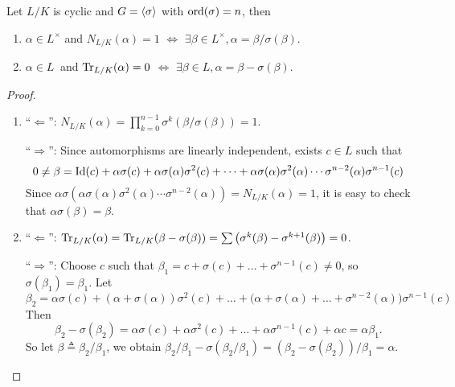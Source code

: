 \begin{theorem} \label{thm:Hilbert-theorem-90}
  Let $L/K$ is cyclic and $G = \langle\sigma\rangle$ with $\operatorname{ord}(\sigma) = n$, then
  \begin{enumerate}
    \item $\alpha \in L^\times$ and $N_{L/K}(\alpha) = 1$ $\iff$ $\exists \beta \in L^\times, \alpha = \beta / \sigma(\beta)$.
    \item $\alpha \in L^{\ }$ and $\operatorname{Tr}_{L/K}(\alpha) = 0$ $\iff$ $\exists \beta \in L, \alpha = \beta - \sigma(\beta)$.
  \end{enumerate}

  \begin{proof} \hfill
    \begin{enumerate}
      \item ``$\Leftarrow$'': $N_{L/K}(\alpha) = \prod_{k=0}^{n-1} \sigma^k(\beta / \sigma(\beta)) = 1$.

        ``$\Rightarrow$'':  Since automorphisms are linearly independent, exists $c \in L$
        such that
        \[ 0 \neq \beta = {\rm Id}(c) + \alpha \sigma(c) + \alpha \sigma(\alpha) \sigma^2(c)
          + \dots + \alpha \sigma(\alpha) \sigma^2(\alpha) \dotsm \sigma^{n-2}(\alpha) \sigma^{n-1}(c) \]
        Since $\alpha\sigma(\alpha \sigma(\alpha) \sigma^2(\alpha) \dotsm \sigma^{n-2}(\alpha)) = N_{L/K}(\alpha) = 1$,
        it is easy to check that $\alpha \sigma(\beta) = \beta$.

      \item ``$\Leftarrow$'': $\operatorname{Tr}_{L/K}(\alpha) = \operatorname{Tr}_{L/K}(\beta - \sigma(\beta))
        = \sum \left(\sigma^k(\beta) -\sigma^{k+1}(\beta)\right) = 0$.

        ``$\Rightarrow$'':
        Choose $c$ such that $\beta_1 = c + \sigma(c) + \dots + \sigma^{n-1}(c) \neq 0$,
        so $\sigma(\beta_1) = \beta_1$.  Let
        \[ \beta_2 = \alpha \sigma(c) + (\alpha + \sigma(\alpha)) \sigma^2(c) + \dots +
          \big( \alpha + \sigma(\alpha) + \dots + \sigma^{n-2}(\alpha) \big) \sigma^{n-1}(c) \]
        Then
        \[ \beta_2 - \sigma(\beta_2) = \alpha \sigma(c) + \alpha \sigma^2(c) + \dots + \alpha \sigma^{n-1}(c)
          + \alpha c = \alpha \beta_1. \]
        So let $\beta \triangleq \beta_2 / \beta_1$, we obtain $\beta_2/\beta_1 - \sigma(\beta_2/\beta_1) =
        (\beta_2 - \sigma(\beta_2)) / \beta_1 = \alpha$.
        \qedhere
    \end{enumerate}
  \end{proof}
\end{theorem}

